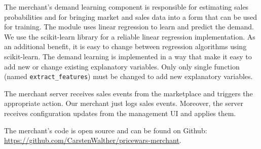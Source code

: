 The merchant's demand learning component is responsible for estimating sales probabilities and for bringing market and sales data into a form that can be used for training.
The module uses linear regression to learn and predict the demand.
We use the scikit-learn library for a reliable linear regression implementation.
As an additional benefit, it is easy to change between regression algorithms using scikit-learn.
The demand learning is implemented in a way that make it easy to add new or change existing explanatory variables.
Only only single function (named \texttt{extract\_features}) must be changed to add new explanatory variables.

The merchant server receives sales events from the marketplace and triggers the appropriate action.
Our merchant just logs sales events.
Moreover, the server receives configuration updates from the management UI and applies them.  

The merchant's code is open source and can be found on Github: \url{https://github.com/CarstenWalther/pricewars-merchant}.


